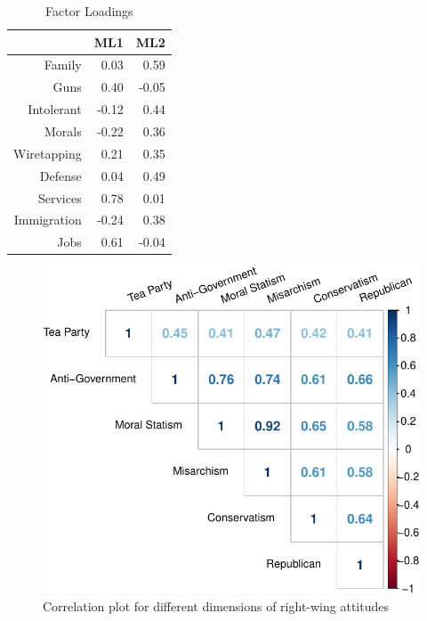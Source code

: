 \documentclass[12pt,]{article}
\begin{document}
\clearpage

\begin{table}[ht]
\centering
\begin{tabular}{rrr}
  \hline
 & ML1 & ML2 \\ 
  \hline
Family & 0.03 & 0.59 \\ 
  Guns & 0.40 & -0.05 \\ 
  Intolerant & -0.12 & 0.44 \\ 
  Morals & -0.22 & 0.36 \\ 
  Wiretapping & 0.21 & 0.35 \\ 
  Defense & 0.04 & 0.49 \\ 
  Services & 0.78 & 0.01 \\ 
  Immigration & -0.24 & 0.38 \\ 
  Jobs & 0.61 & -0.04 \\ 
   \hline
\end{tabular}
\caption{Factor Loadings} 
\label{Factor Loadings}
\end{table}

\begin{figure}[htbp]
\centering
\includegraphics{figures/descriptives-1.pdf}
\caption{Correlation plot for different dimensions of right-wing
attitudes}
\end{figure}

\clearpage
\end{document}
